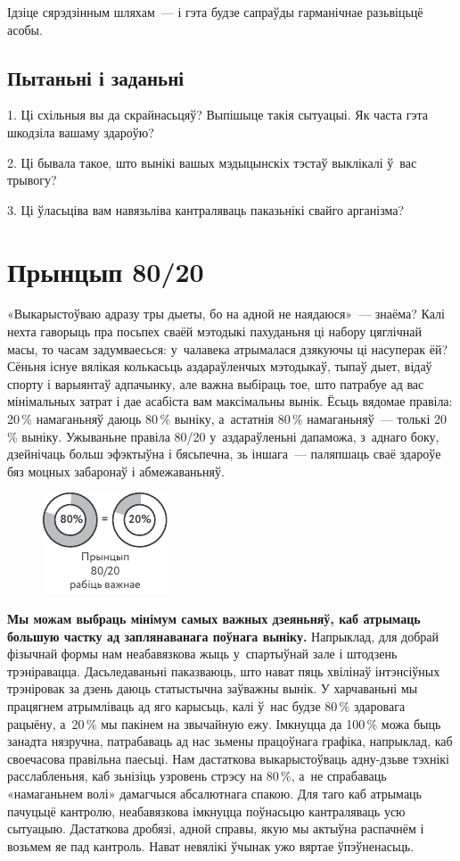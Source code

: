 Ідзіце сярэдзінным шляхам~--- і гэта будзе сапраўды гарманічнае разьвіцьцё асобы.

\subsection*{Пытаньні і заданьні}

1. Ці схільныя вы да скрайнасьцяў? Выпішыце такія сытуацыі. Як часта гэта шкодзіла вашаму здароўю?

2. Ці бывала такое, што вынікі вашых мэдыцынскіх тэстаў выклікалі ў~вас трывогу?

3. Ці ўласьціва вам навязьліва кантраляваць паказьнікі свайго арганізма?


\section{Прынцып 80/20}

«Выкарыстоўваю адразу тры дыеты, бо на адной не наядаюся»~--- знаёма? Калі нехта гаворыць пра посьпех сваёй мэтодыкі пахуданьня ці набору цяглічнай масы, то часам задумваесься: у~чалавека атрымалася дзякуючы ці насуперак ёй? Сёньня існуе вялікая колькасьць аздараўленчых мэтодыкаў, тыпаў дыет, відаў спорту і варыянтаў адпачынку, але важна выбіраць тое, што патрабуе ад вас мінімальных затрат і дае асабіста вам максімальны вынік. Ёсьць вядомае правіла: 20\,\% намаганьняў даюць 80\,\% выніку, а~астатнія 80\,\% намаганьняў~--- толькі 20\,\% выніку. Ужываньне правіла 80/20 у~аздараўленьні дапаможа, з~аднаго боку, дзейнічаць больш эфэктыўна і бясьпечна, зь іншага~--- паляпшаць сваё здароўе бяз моцных забаронаў і абмежаваньняў.

\begin{figure}[htb!]
  \centering
  \includegraphics[scale=1.5]{willpower/ch3/10.pdf}
\end{figure}

\textbf{Мы можам выбраць мінімум самых важных дзеяньняў, каб атрымаць большую частку ад заплянаванага поўнага выніку.} Напрыклад, для добрай фізычнай формы нам неабавязкова жыць у~спартыўнай зале і штодзень трэніравацца. Дасьледаваньні паказваюць, што нават пяць хвілінаў інтэнсіўных трэніровак за дзень даюць статыстычна заўважны вынік. У харчаваньні мы працягнем атрымліваць ад яго карысьць, калі ў~нас будзе 80\,\% здаровага рацыёну, а~20\,\% мы пакінем на звычайную ежу. Імкнуцца да 100\,\% можа быць занадта нязручна, патрабаваць ад нас зьмены працоўнага графіка, напрыклад, каб своечасова правільна паесьці. Нам дастаткова выкарыстоўваць адну-дзьве тэхнікі расслабленьня, каб зьнізіць узровень стрэсу на 80\,\%, а~не спрабаваць «намаганьнем волі» дамагчыся абсалютнага спакою. Для таго каб атрымаць пачуцьцё кантролю, неабавязкова імкнуцца поўнасьцю кантраляваць усю сытуацыю. Дастаткова дробязі, адной справы, якую мы актыўна распачнём і возьмем яе пад кантроль. Нават невялікі ўчынак ужо вяртае ўпэўненасьць.

